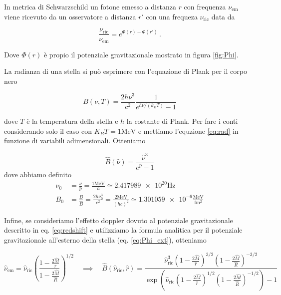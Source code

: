 \documentclass[a4paper, titlepage]{article}
\newcommand{\Sh}[0]{Schwarzschild }
\begin{document}
In metrica di \Sh un fotone emesso a distanza $r$ con frequenza $\nu_\text{em}$ viene ricevuto da un osservatore a distanza $r'$ con una frequeza $\nu_\text{ric}$ data da

\begin{equation}
    \frac{\nu_\text{ric}}{\nu_\text{em}} = e^{\Phi (r) - \Phi (r')} \, .
\label{eq:redshift}
\end{equation}

Dove $\Phi (r)$ è propio il potenziale gravitazionale mostrato in figura \ref{fig:Phi}.

La radianza di una stella si può esprimere con l'equazione di Plank per il corpo nero

\begin{equation}
    B(\nu, T) = \frac{2 h \nu ^3}{c^2} \frac{1}{e^{h \nu / (k_B T)} - 1}
    \label{eq:rad}
\end{equation}

dove $T$ è la temperatura della stella e $h$ la costante di Plank.
Per fare i conti considerando solo il caso con $K_B T = 1 \unit{\mega\electronvolt}$ e mettiamo l'equzione \ref{eq:rad} in funzione di variabili adimensionali. Otteniamo

\begin{equation}
    \hat B(\hat \nu) = \frac{\hat \nu ^3 }{e^{\hat \nu} - 1}
    \label{eq:B_ad}
\end{equation}
dove abbiamo definito
\begin{align}
    \nu_0 &= \frac{\nu}{\hat \nu} = \frac{1\unit{\mega\electronvolt}}{h} \simeq \num{2.417989e20} \unit{\hertz} \label{eq:B0def}\\
    B_0 &= \frac{B}{\hat B} = \frac{2 h \nu_0^3}{c^2} = \frac{2 \unit{\mega\electronvolt}}{(h c)^2} \simeq \num{1.301059e-6} \frac{\unit{\mega\electronvolt}}{\unit{\femto\meter\squared}} \label{eq:nu0def}
\end{align}

Infine, se consideriamo l'effetto doppler dovuto al potenziale gravitazionale descritto in eq. \ref{eq:redshift} e utilizziamo la formula analitica per il potenziale gravitazionale all'esterno della stella (eq. \ref{eq:Phi_ext}), otteniamo

\begin{equation}
    \hat \nu_\text{em} = \hat \nu_\text{ric} \left ( \frac{1 - \frac{2 \hat M}{r}}{1 - \frac{2 \hat M}{\hat R}}\right )^{1/2}
    \quad
    \implies
    \quad
    \hat B(\hat \nu_\text{ric}, \hat r) =
    \frac{\hat \nu_\text{ric}^3 \left(1 - \frac{2 \hat M}{\hat r}\right)^{3/2} \left(1 - \frac{2 \hat M}{\hat R}\right)^{-3/2} }
    {\exp( \hat \nu_\text{ric} \left(1 - \frac{2 \hat M}{\hat r} \right)^{1/2} \left(1 - \frac{2 \hat M}{\hat R}\right)^{-1/2} ) - 1}
    \label{eq:B_corr}
\end{equation}
\end{document}
